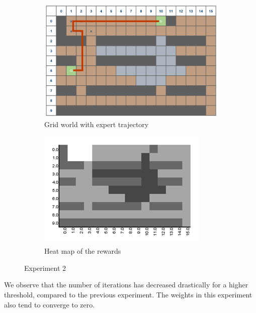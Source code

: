\documentclass[10pt,a4paper,twocolumn]{article}
\begin{document}
\begin{figure}[h]
\begin{subfigure}[b]{0.5\textwidth}
	\includegraphics[width=\textwidth]{experiment_2_gridworld}
	\caption{Grid world with expert trajectory}
	\label{fig:experiment2trajectory}
\end{subfigure}
\begin{subfigure}[b]{0.5\textwidth}
	\includegraphics[width=\textwidth]{experiment_2_heatmap}
	\caption{Heat map of the rewards}
	\label{fig:experiment2heatmap}
\end{subfigure}
\caption{Experiment 2}
\end{figure}

We observe that the number of iterations has decreased drastically for a higher threshold, compared to the previous experiment. The weights in this experiment also tend to converge to zero. 
\end{document}
